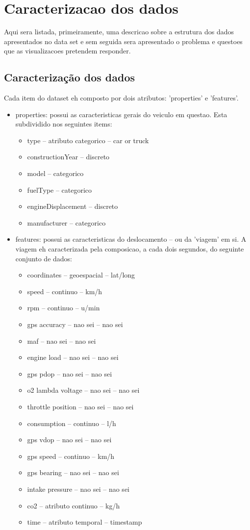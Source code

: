 \documentclass[10pt, conference]{IEEEtran}
\begin{document}
\section{Caracterizacao dos dados}
%
Aqui sera listada, primeiramente, uma descricao sobre a estrutura dos dados apresentados no data set e
sem seguida sera apresentado o problema e questoes que as visualizacoes pretendem responder.

\subsection{Caracterização dos dados}
Cada item do dataset eh composto por dois atributos: 'properties' e 'features'. 

\begin{itemize}

  \item properties: possui as caracteristicas gerais do veiculo em questao. Esta subdividido
  nos seguintes items:
  \begin{itemize}
    \item type -- atributo  categorico -- car or truck
    \item constructionYear -- discreto 
    \item model -- categorico
    \item fuelType -- categorico
    \item engineDisplacement -- discreto
    \item manufacturer -- categorico
  \end{itemize}    

  \item features: possui as caracteristicas do deslocamento -- ou da 'viagem' em si. A viagem
  eh caracterizada pela composicao, a cada dois segundos, do seguinte conjunto de dados:
  \begin{itemize}
    \item coordinates -- geoespacial -- lat/long
    \item speed -- continuo -- km/h
    \item rpm -- continuo -- u/min
    \item gps accuracy -- nao sei -- nao sei
    \item maf -- nao sei -- nao sei
    \item engine load -- nao sei -- nao sei
    \item gps pdop -- nao sei -- nao sei
    \item o2 lambda voltage -- nao sei -- nao sei
    \item throttle position -- nao sei -- nao sei
    \item consumption -- continuo -- l/h
    \item gps vdop -- nao sei -- nao sei
    \item gps speed -- continuo -- km/h
    \item gps bearing -- nao sei -- nao sei
    \item intake pressure -- nao sei -- nao sei
    \item co2 -- atributo continuo -- kg/h
    \item time -- atributo temporal -- timestamp


\end{itemize}
\end{itemize}
\end{document}
